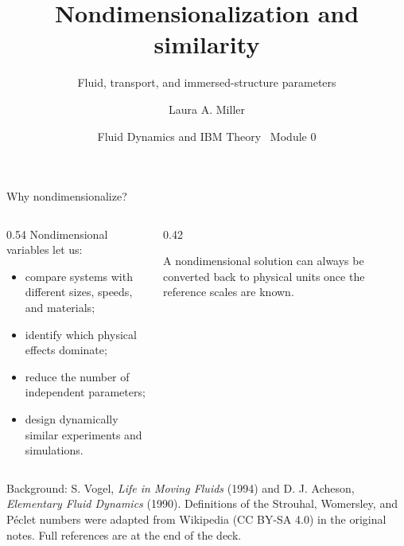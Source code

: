 \documentclass[aspectratio=169,11pt]{beamer}
\title[Scaling and similarity]{Nondimensionalization and similarity}
\subtitle{Fluid, transport, and immersed-structure parameters}
\author[Miller]{Laura A. Miller}
\institute[UArizona]{Department of Mathematics, University of Arizona}
\date{Fluid Dynamics and IBM Theory \textbullet\ Module 0}
\begin{document}
\begin{frame}[plain]
\renewcommand{\includegraphics}[2][]{%
  \begin{punchbox}
  \centering
  \[
    \mathrm{Re}=\frac{\rho U L}{\mu},
    \qquad
    \mathrm{St}_L=\frac{fL}{U}
  \]
  \[
    \alpha=L\sqrt{\frac{\omega}{\nu}},
    \qquad
    \mathrm{Pe}=\frac{UL}{D}
  \]
  \end{punchbox}}
\end{frame}

\begin{frame}{Why nondimensionalize?}
\begin{columns}[T,onlytextwidth]
\begin{column}{0.54\textwidth}
Nondimensional variables let us:
\begin{itemize}\itemsep5pt
  \item compare systems with different sizes, speeds, and materials;
  \item identify which physical effects dominate;
  \item reduce the number of independent parameters;
  \item design dynamically similar experiments and simulations.
\end{itemize}
\end{column}
\begin{column}{0.42\textwidth}
\begin{punchbox}
\small
A nondimensional solution can always be converted back to physical units once the reference scales are known.
\end{punchbox}
\medskip
{}
\end{column}
\end{columns}
\vfill
{\scriptsize\color{DarkGray} Background: S. Vogel, \emph{Life in Moving Fluids} (1994) and D. J. Acheson, \emph{Elementary Fluid Dynamics} (1990). Definitions of the Strouhal, Womersley, and P\'eclet numbers were adapted from Wikipedia (CC BY-SA 4.0) in the original notes. Full references are at the end of the deck.\par}
\end{frame}
\end{document}
